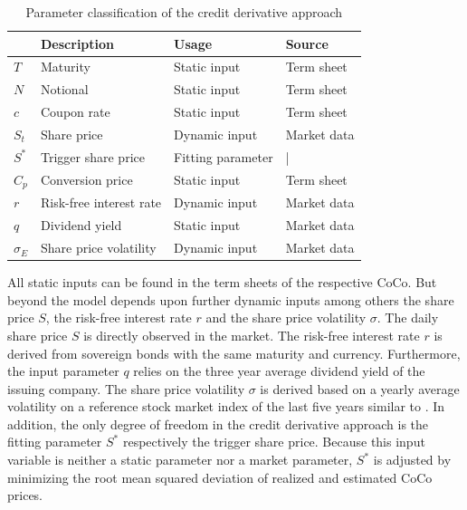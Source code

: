 \begin{table}[H]
 \setlength{\extrarowheight}{2.5pt}
 \centering
 \begin{tabular}{llll}
  \toprule
    & \textbf{Description} & \textbf{Usage} & \textbf{Source} \\
  \midrule
   $T$ & Maturity & Static input & Term sheet \\
   $N$ & Notional & Static input & Term sheet \\   
   $c$ & Coupon rate & Static input & Term sheet \\
   $S_t$ & Share price & Dynamic input & Market data \\
   $S^*$ & Trigger share price & Fitting parameter & | \\
   $C_p$ & Conversion price & Static input & Term sheet \\
   $r$ & Risk-free interest rate & Dynamic input & Market data \\
   $q$ & Dividend yield & Static input & Market data\\
   $\sigma_E$& Share price volatility & Dynamic input & Market data \\
  \bottomrule
 \end{tabular}
 \caption[Parameter classification of the credit derivative approach]{Parameter classification of the credit derivative approach \citep{wilkens2014contingent}}
 \label{creditparameters}
\end{table}

All static inputs can be found in the term sheets of the respective CoCo. But beyond the model depends upon further dynamic inputs among others the share price $S$, the risk-free interest rate $r$ and the share price volatility $\sigma$. The daily share price $S$ is directly observed in the market. The risk-free interest rate $r$ is derived from sovereign bonds with the same maturity and currency. Furthermore, the input parameter $q$ relies on the three year average dividend yield of the issuing company. The share price volatility $\sigma$ is derived based on a yearly average volatility on a reference stock market index of the last five years similar to \citet{alvemar2012modelling}. In addition, the only degree of freedom in the credit derivative approach is the fitting parameter $S^*$ respectively the trigger share price. Because this input variable is neither a static parameter nor a market parameter, $S^*$ is adjusted by minimizing the root mean squared deviation of realized and estimated CoCo prices. \citep{erismann2011analytical}

